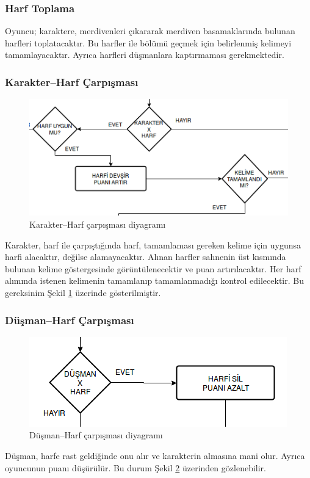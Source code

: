 \documentclass[12pt,a4paper]{article}
\begin{document}
   \subsubsection{Harf Toplama}
   Oyuncu; karaktere, merdivenleri çıkararak merdiven basamaklarında bulunan harfleri toplatacaktır. Bu harfler ile bölümü geçmek için belirlenmiş kelimeyi tamamlayacaktır. Ayrıca harfleri düşmanlara kaptırmaması gerekmektedir.

   \subsubsection{Karakter--Harf Çarpışması}
   \begin{figure}[h!]
      \begin{center}
         \includegraphics{res/cxl.png}
         \caption{Karakter--Harf çarpışması diyagramı}
         \label{fig:cxl}
      \end{center}
   \end{figure}
   Karakter, harf ile çarpıştığında harf, tamamlaması gereken kelime için uygunsa harfi alacaktır, değilse alamayacaktır. Alınan harfler sahnenin üst kısmında bulunan kelime göstergesinde görüntülenecektir ve puan artırılacaktır. Her harf alımında istenen kelimenin tamamlanıp tamamlanmadığı kontrol edilecektir. Bu gereksinim Şekil \ref{fig:cxl} üzerinde gösterilmiştir.

   \subsubsection{Düşman--Harf Çarpışması}
   \begin{figure}[h!]
      \begin{center}
         \includegraphics{res/exl.png}
         \caption{Düşman--Harf çarpışması diyagramı}
         \label{fig:exl}
      \end{center}
   \end{figure}
   Düşman, harfe rast geldiğinde onu alır ve karakterin almasına mani olur. Ayrıca oyuncunun puanı düşürülür. Bu durum Şekil \ref{fig:exl} üzerinden gözlenebilir.
\end{document}
